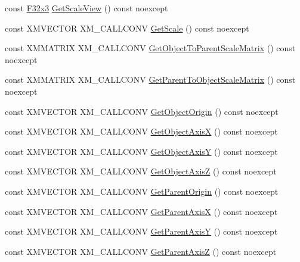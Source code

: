 \begin{DoxyCompactItemize}
\item 
const \mbox{\hyperlink{namespacemage_a1e3c7a882af461f161caa1cbddaf1fa2}{F32x3}} \mbox{\hyperlink{classmage_1_1_transform_a7b51394c05f161d20fa630ace871d5a5}{Get\+Scale\+View}} () const noexcept
\item 
const X\+M\+V\+E\+C\+T\+OR X\+M\+\_\+\+C\+A\+L\+L\+C\+O\+NV \mbox{\hyperlink{classmage_1_1_transform_a4b02496d784a0fb8074c89dd9b6580d7}{Get\+Scale}} () const noexcept
\item 
const X\+M\+M\+A\+T\+R\+IX X\+M\+\_\+\+C\+A\+L\+L\+C\+O\+NV \mbox{\hyperlink{classmage_1_1_transform_af69febeb1c8795d4d3e71a712e4ab3b8}{Get\+Object\+To\+Parent\+Scale\+Matrix}} () const noexcept
\item 
const X\+M\+M\+A\+T\+R\+IX X\+M\+\_\+\+C\+A\+L\+L\+C\+O\+NV \mbox{\hyperlink{classmage_1_1_transform_a77a9313c62c19dd49c11f5fa30fa2ac5}{Get\+Parent\+To\+Object\+Scale\+Matrix}} () const noexcept
\item 
const X\+M\+V\+E\+C\+T\+OR X\+M\+\_\+\+C\+A\+L\+L\+C\+O\+NV \mbox{\hyperlink{classmage_1_1_transform_ab0920e283e8f21d2ca766c2409993ee4}{Get\+Object\+Origin}} () const noexcept
\item 
const X\+M\+V\+E\+C\+T\+OR X\+M\+\_\+\+C\+A\+L\+L\+C\+O\+NV \mbox{\hyperlink{classmage_1_1_transform_a22ac692a1ff459dc85950e2810c34de9}{Get\+Object\+AxisX}} () const noexcept
\item 
const X\+M\+V\+E\+C\+T\+OR X\+M\+\_\+\+C\+A\+L\+L\+C\+O\+NV \mbox{\hyperlink{classmage_1_1_transform_a11db94a3ba905405cccfd5f0e5ecf6d2}{Get\+Object\+AxisY}} () const noexcept
\item 
const X\+M\+V\+E\+C\+T\+OR X\+M\+\_\+\+C\+A\+L\+L\+C\+O\+NV \mbox{\hyperlink{classmage_1_1_transform_a404fdd1491f8f35376a78f7bd96d09b2}{Get\+Object\+AxisZ}} () const noexcept
\item 
const X\+M\+V\+E\+C\+T\+OR X\+M\+\_\+\+C\+A\+L\+L\+C\+O\+NV \mbox{\hyperlink{classmage_1_1_transform_ac781a4843051cdc9b5078dbc641707d1}{Get\+Parent\+Origin}} () const noexcept
\item 
const X\+M\+V\+E\+C\+T\+OR X\+M\+\_\+\+C\+A\+L\+L\+C\+O\+NV \mbox{\hyperlink{classmage_1_1_transform_a0a99aa4625d2bfea0d0484f23bde0d65}{Get\+Parent\+AxisX}} () const noexcept
\item 
const X\+M\+V\+E\+C\+T\+OR X\+M\+\_\+\+C\+A\+L\+L\+C\+O\+NV \mbox{\hyperlink{classmage_1_1_transform_a81c1514a624946249e9c7ec65871b599}{Get\+Parent\+AxisY}} () const noexcept
\item 
const X\+M\+V\+E\+C\+T\+OR X\+M\+\_\+\+C\+A\+L\+L\+C\+O\+NV \mbox{\hyperlink{classmage_1_1_transform_ab5ce18e39ad529b2e87ff0df1125f076}{Get\+Parent\+AxisZ}} () const noexcept

\end{DoxyCompactItemize}
